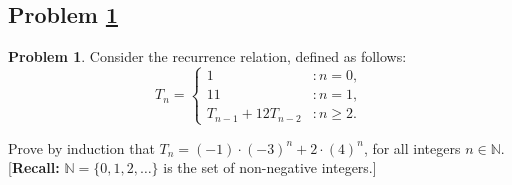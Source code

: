 \documentclass[11pt]{article}
\theoremstyle{definition}
\theoremstyle{definition}
\newtheorem{required}{Problem}
\theoremstyle{definition}
\begin{document}
\newpage
\subsection{Problem \ref{Induction2}} 
\begin{required} \label{Induction2}
Consider the recurrence relation, defined as follows:
\[
T_{n} = \begin{cases} 1 & : n = 0, \\
11 & : n = 1, \\
T_{n-1} + 12T_{n-2} & : n \geq 2.
\end{cases}
\]

\noindent Prove by induction that $T_{n} = (-1) \cdot (-3)^{n} + 2 \cdot (4)^{n}$, for all integers $n \in \mathbb{N}$. [\textbf{Recall:} $\mathbb{N} = \{0, 1, 2, \ldots \}$ is the set of non-negative integers.]
\end{required}
\end{document}
